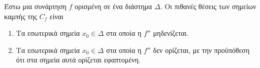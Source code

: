 Έστω μια συνάρτηση $ f $ ορισμένη σε ένα διάστημα $ \Delta $. Οι πιθανές θέσεις των σημείων καμπής της $ C_f $ είναι
\begin{enumerate}
\item Τα εσωτερικά σημεία $ x_0\in\Delta $ στα οποία η $ f'' $ μηδενίζεται.
\item Τα εσωτερικά σημεία $ x_0\in\Delta $ στα οποία η $ f'' $ δεν ορίζεται, με την προϋπόθεση ότι στα σημεία αυτά ορίζεται εφαπτομένη.
\end{enumerate}
